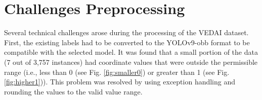 


\section{Challenges Preprocessing}
Several technical challenges arose during the processing of the VEDAI dataset.
First, the existing labels had to be converted to the \acrshort{YOLO}v9-\acrshort{obb} format to be compatible with the selected model.
It was found that a small portion of the data (7 out of 3,757 instances) had coordinate values that were outside the permissible range (i.e., less than 0 (see Fig. \ref{fig:smaller0}) or greater than 1 (see Fig. \ref{fig:higher1})). 
This problem was resolved by using exception handling and rounding the values to the valid value range.
 


